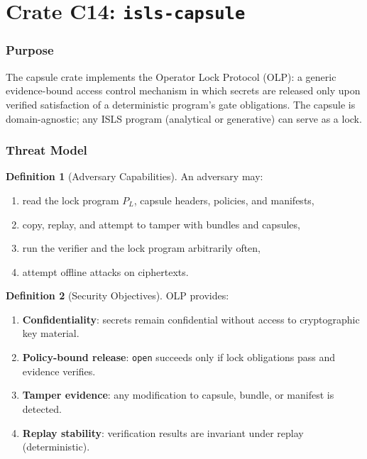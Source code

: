 \documentclass[11pt,a4paper,twoside]{article}
\theoremstyle{definition}
\newtheorem{definition}{Definition}[section]
\theoremstyle{plain}
\theoremstyle{remark}
\newcommand{\ISLS}{\textsf{ISLS}}
\begin{document}
\part{Crate C14: \texttt{isls-capsule}}\label{part:capsule}

\section{Purpose}\label{sec:cap:purpose}

The capsule crate implements the Operator Lock Protocol (OLP): a generic
evidence-bound access control mechanism in which secrets are released
only upon verified satisfaction of a deterministic program's gate
obligations. The capsule is domain-agnostic; any \ISLS{} program
(analytical or generative) can serve as a lock.

\section{Threat Model}\label{sec:cap:threat}

\begin{definition}[Adversary Capabilities]\label{def:adversary}
An adversary may:
\begin{enumerate}[nosep,label=(\roman*)]
  \item read the lock program $P_L$, capsule headers, policies, and
        manifests,
  \item copy, replay, and attempt to tamper with bundles and capsules,
  \item run the verifier and the lock program arbitrarily often,
  \item attempt offline attacks on ciphertexts.
\end{enumerate}
\end{definition}

\begin{definition}[Security Objectives]\label{def:secobjectives}
OLP provides:
\begin{enumerate}[nosep,label=(\roman*)]
  \item \textbf{Confidentiality}: secrets remain confidential without
        access to cryptographic key material.
  \item \textbf{Policy-bound release}: \texttt{open} succeeds only if
        lock obligations pass and evidence verifies.
  \item \textbf{Tamper evidence}: any modification to capsule, bundle,
        or manifest is detected.
  \item \textbf{Replay stability}: verification results are invariant
        under replay (deterministic).
\end{enumerate}
\end{definition}
\end{document}
